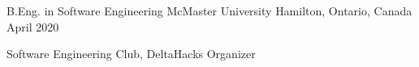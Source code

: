 


\begin{cventries}


\cventry
{B.Eng. in Software Engineering} %
{McMaster University} %
{Hamilton, Ontario, Canada} %
{April 2020} %
{ %
\begin{cvitems}
\item {Software Engineering Club, DeltaHacks Organizer}
\end{cvitems}
}


\end{cventries}